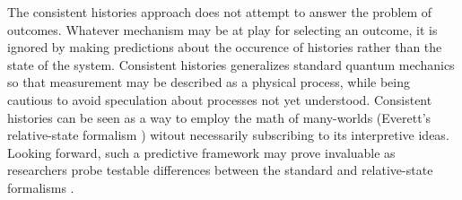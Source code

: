 The consistent histories approach does not attempt to answer the problem of outcomes. Whatever mechanism may be at play for selecting an  outcome, it is ignored by making predictions about the occurence of histories rather than the state of the system. Consistent histories generalizes standard quantum mechanics so that measurement may be described as a physical process, while being cautious to avoid speculation about processes not yet understood. Consistent histories can be seen as a way to employ the math of many-worlds (Everett's relative-state formalism \cite{everett}) witout necessarily subscribing to its interpretive ideas. Looking forward, such a predictive framework may prove invaluable as researchers probe testable differences between the standard and relative-state formalisms \cite{baumann, proietti}.

%
%
%
%
%
%
